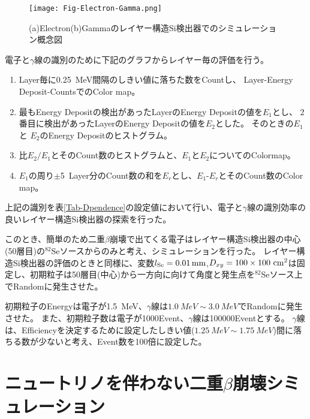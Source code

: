 \documentclass[a4paper,10pt]{jreport}
\begin{document}
\begin{figure}[H]
	\center
	\texttt{[image: Fig-Electron-Gamma.png]}
	\caption{(a)Electron(b)Gammaのレイヤー構造Si検出器でのシミュレーション概念図} \label{Fig-Electron-Gamma}
\end{figure}

電子と$\gamma$線の識別のために下記のグラフからレイヤー毎の評価を行う。

\begin{enumerate}
	\item Layer毎に\SI{0.25}{MeV}間隔のしきい値に落ちた数をCountし、
	Layer-Energy Deposit-CountsでのColor map。
	
	\item 最もEnergy Depositの検出があったLayerのEnergy Depositの値を$E_1$とし、
	2番目に検出があったLayerのEnergy Depositの値を$E_2$とした。
	そのときの$E_1$と $E_2$のEnergy Depositのヒストグラム。
	
	\item 比$E_2/E_1$とそのCount数のヒストグラムと、$E_1$と$E_2$についてのColormap。
	
	\item $E_1$の周り$\pm$\SI{5}{Layer}分のCount数の和を$E_r$とし、$E_1$-$E_r$とそのCount数のColor map。
	
\end{enumerate}

上記の識別を表\ref{Tab-Dpendence}の設定値において行い、電子と$\gamma$線の識別効率の良いレイヤー構造Si検出器の探索を行った。

このとき、簡単のため二重$\beta$崩壊で出てくる電子はレイヤー構造Si検出器の中心(50層目)の$^{82}$Seソースからのみと考え、シミュレーションを行った。
レイヤー構造Si検出器の評価のときと同様に、変数$l_{\rm{Se}} = \SI{0.01}{mm}$,$D_{xy} =100\times100\ \rm{cm}^2$は固定し、初期粒子は50層目(中心)から一方向に向けて角度と発生点を$^{82}$Seソース上でRandomに発生させた。

初期粒子のEnergyは電子が\SI{1.5}{MeV}、$\gamma$線は$\SI{1.0}{MeV}\sim\SI{3.0}{MeV}$でRandomに発生させた。
また、初期粒子数は電子が1000Event、$\gamma$線は100000Eventとする。
$\gamma$線は、Efficiencyを決定するために設定したしきい値($\SI{1.25}{MeV}\sim\SI{1.75}{MeV}$)間に落ちる数が少ないと考え、Event数を100倍に設定した。



\section{ニュートリノを伴わない二重$\beta$崩壊シミュレーション}
\end{document}
